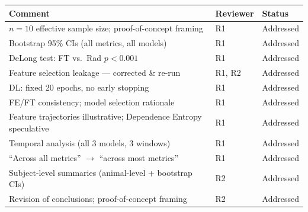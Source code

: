 \documentclass[12pt]{article}
\begin{document}
\begin{table}[h]
\centering\small
\begin{tabular}{p{9.5cm}ll}
\toprule
Comment & Reviewer & Status \\
\midrule
$n=10$ effective sample size; proof-of-concept framing & R1 & Addressed \\
Bootstrap 95\% CIs (all metrics, all models) & R1 & Addressed \\
DeLong test: FT vs.\ Rad $p<0.001$ & R1 & Addressed \\
Feature selection leakage — corrected \& re-run & R1, R2 & Addressed \\
DL: fixed 20 epochs, no early stopping & R1 & Addressed \\
FE/FT consistency; model selection rationale & R1 & Addressed \\
Feature trajectories illustrative; Dependence Entropy speculative & R1 & Addressed \\
Temporal analysis (all 3 models, 3 windows) & R1 & Addressed \\
``Across all metrics'' $\to$ ``across most metrics'' & R1 & Addressed \\
Subject-level summaries (animal-level + bootstrap CIs) & R2 & Addressed \\
Revision of conclusions; proof-of-concept framing & R2 & Addressed \\
\bottomrule
\end{tabular}
\end{table}

\bigskip



\end{document}
